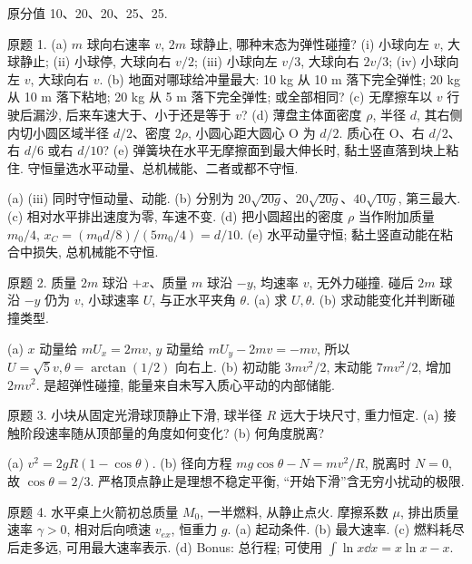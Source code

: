 原分值 10、20、20、25、25.
\begin{exercise}
原题 1. (a) $m$ 球向右速率 $v$, $2m$ 球静止, 哪种末态为弹性碰撞? (i) 小球向左 $v$, 大球静止; (ii) 小球停, 大球向右 $v/2$; (iii) 小球向左 $v/3$, 大球向右 $2v/3$; (iv) 小球向左 $v$, 大球向右 $v$. (b) 地面对哪球给冲量最大: 10 kg 从 10 m 落下完全弹性; 20 kg 从 10 m 落下粘地; 20 kg 从 5 m 落下完全弹性; 或全部相同? (c) 无摩擦车以 $v$ 行驶后漏沙, 后来车速大于、小于还是等于 $v$? (d) 薄盘主体面密度 $\rho$, 半径 $d$, 其右侧内切小圆区域半径 $d/2$、密度 $2\rho$, 小圆心距大圆心 O 为 $d/2$. 质心在 O、右 $d/2$、右 $d/6$ 或右 $d/10$? (e) 弹簧块在水平无摩擦面到最大伸长时, 黏土竖直落到块上粘住. 守恒量选水平动量、总机械能、二者或都不守恒.
\end{exercise}
\begin{solution}
(a) (iii) 同时守恒动量、动能. (b) 分别为 $20\sqrt{20g}$、$20\sqrt{20g}$、$40\sqrt{10g}$, 第三最大. (c) 相对水平排出速度为零, 车速不变. (d) 把小圆超出的密度 $\rho$ 当作附加质量 $m_0/4$, $x_C=(m_0d/8)/(5m_0/4)=d/10$. (e) 水平动量守恒; 黏土竖直动能在粘合中损失, 总机械能不守恒.
\end{solution}
\begin{exercise}
原题 2. 质量 $2m$ 球沿 $+x$、质量 $m$ 球沿 $-y$, 均速率 $v$, 无外力碰撞. 碰后 $2m$ 球沿 $-y$ 仍为 $v$, 小球速率 $U$, 与正水平夹角 $\theta$. (a) 求 $U,\theta$. (b) 求动能变化并判断碰撞类型.
\end{exercise}
\begin{solution}
(a) $x$ 动量给 $mU_x=2mv$, $y$ 动量给 $mU_y-2mv=-mv$, 所以 $U=\sqrt5v,\theta=\arctan(1/2)$ 向右上. (b) 初动能 $3mv^2/2$, 末动能 $7mv^2/2$, 增加 $2mv^2$. 是超弹性碰撞, 能量来自未写入质心平动的内部储能.
\end{solution}
\begin{exercise}
原题 3. 小块从固定光滑球顶静止下滑, 球半径 $R$ 远大于块尺寸, 重力恒定. (a) 接触阶段速率随从顶部量的角度如何变化? (b) 何角度脱离?
\end{exercise}
\begin{solution}
(a) $v^2=2gR(1-\cos\theta)$. (b) 径向方程 $mg\cos\theta-N=mv^2/R$, 脱离时 $N=0$, 故 $\cos\theta=2/3$. 严格顶点静止是理想不稳定平衡, “开始下滑”含无穷小扰动的极限.
\end{solution}
\begin{exercise}
原题 4. 水平桌上火箭初总质量 $M_0$, 一半燃料, 从静止点火. 摩擦系数 $\mu$, 排出质量速率 $\gamma>0$, 相对后向喷速 $v_{ex}$, 恒重力 $g$. (a) 起动条件. (b) 最大速率. (c) 燃料耗尽后走多远, 可用最大速率表示. (d) Bonus: 总行程; 可使用 $\int\ln x\dd x=x\ln x-x$.
\end{exercise}
